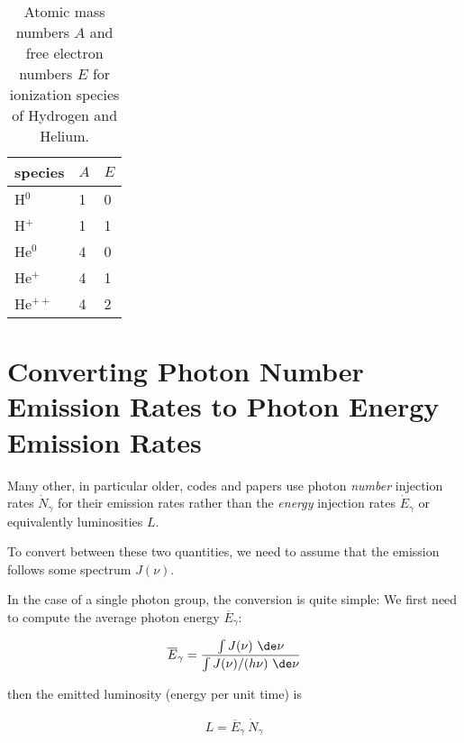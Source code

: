 \begin{table}
\begin{center}
\begin{tabular}{l|ll}
species  & $A$ & $E$ \\
\hline
H$^0$    & 1 & 0 \\
H$^+$    & 1 & 1 \\
He$^0$   & 4 & 0 \\
He$^+$   & 4 & 1 \\
He$^{++}$  & 4 & 2 \\
\end{tabular}
\end{center}
\caption{Atomic mass numbers $A$ and free electron numbers $E$ for ionization species of Hydrogen 
and Helium.}
\label{tab:mass-and-electron-numbers}
\end{table}










\section{Converting Photon Number Emission Rates to Photon Energy Emission Rates}

Many other, in particular older, codes and papers use photon \emph{number} injection rates $\dot{N}_{\gamma}$ for their emission rates rather than the \emph{energy} injection rates $\dot{E}_\gamma$ or equivalently luminosities $L$.

To convert between these two quantities, we need to assume that the emission follows some spectrum $J(\nu)$.

In the case of a single photon group, the conversion is quite simple: We first need to compute the average photon energy $\overline{E}_\gamma$:

\begin{align}
	\overline{E}_\gamma = \frac{\int J(\nu) \ \de \nu }{\int J(\nu) / (h \nu) \ \de \nu}
\end{align}

then the emitted luminosity (energy per unit time) is

\begin{align}
	L = \overline{E}_\gamma \ \dot{N}_{\gamma}
\end{align}

